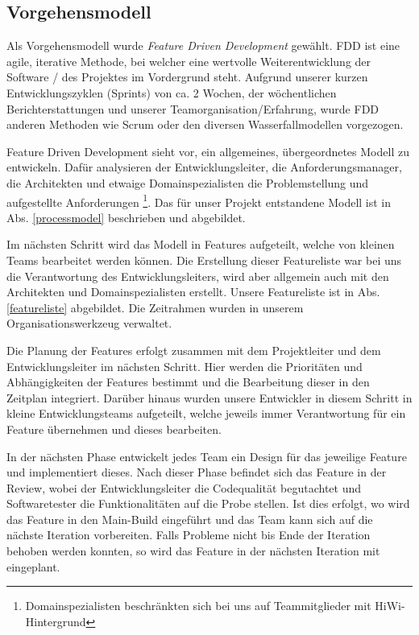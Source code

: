 \documentclass[12pt,a4paper]{scrartcl}
\newcommand{\italic}[1]{\textit{#1}}
\begin{document}

\subsection{Vorgehensmodell}
Als Vorgehensmodell wurde \italic{Feature Driven Development} gewählt.
FDD ist eine agile, iterative Methode, bei welcher eine wertvolle Weiterentwicklung der Software / des Projektes im Vordergrund steht. \cite{fdd}
Aufgrund unserer kurzen Entwicklungszyklen (Sprints) von ca. 2 Wochen, der wöchentlichen Berichterstattungen und unserer Teamorganisation/Erfahrung, wurde FDD anderen Methoden wie Scrum oder den diversen Wasserfallmodellen vorgezogen.

Feature Driven Development sieht vor, ein allgemeines, übergeordnetes Modell zu entwickeln.
Dafür analysieren der Entwicklungsleiter, die Anforderungsmanager, die Architekten und etwaige Domainspezialisten die Problemstellung und aufgestellte Anforderungen \footnote{Domainspezialisten beschränkten sich bei uns auf Teammitglieder mit HiWi-Hintergrund}.
Das für unser Projekt entstandene Modell ist in Abs. \ref{processmodel} beschrieben und abgebildet.

Im nächsten Schritt wird das Modell in Features aufgeteilt, welche von kleinen Teams bearbeitet werden können.
Die Erstellung dieser Featureliste war bei uns die Verantwortung des Entwicklungsleiters, wird aber allgemein auch mit den Architekten und Domainspezialisten erstellt.
Unsere Featureliste ist in Abs. \ref{featureliste} abgebildet.
Die Zeitrahmen wurden in unserem Organisationswerkzeug verwaltet.

Die Planung der Features erfolgt zusammen mit dem Projektleiter und dem Entwicklungsleiter im nächsten Schritt.
Hier werden die Prioritäten und Abhängigkeiten der Features bestimmt und die Bearbeitung dieser in den Zeitplan integriert.
Darüber hinaus wurden unsere Entwickler in diesem Schritt in kleine Entwicklungsteams aufgeteilt, welche jeweils immer Verantwortung für ein Feature übernehmen und dieses bearbeiten.

In der nächsten Phase entwickelt jedes Team ein Design für das jeweilige Feature und implementiert dieses.
Nach dieser Phase befindet sich das Feature in der Review, wobei der Entwicklungsleiter die Codequalität begutachtet und Softwaretester die Funktionalitäten auf die Probe stellen.
Ist dies erfolgt, wo wird das Feature in den Main-Build eingeführt und das Team kann sich auf die nächste Iteration vorbereiten.
Falls Probleme nicht bis Ende der Iteration behoben werden konnten, so wird das Feature in der nächsten Iteration mit eingeplant.
\end{document}
